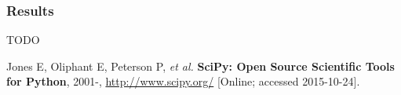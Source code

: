 \documentclass{article}
\begin{document}
\subsubsection{Results}
{\large TODO}


\begin{thebibliography}{9}

    Jones E, Oliphant E, Peterson P, \emph{et al.}
    {\bf SciPy: Open Source Scientific Tools for Python}, 2001-,
    \url{http://www.scipy.org/} [Online; accessed 2015-10-24].

\end{thebibliography}
\end{document}

